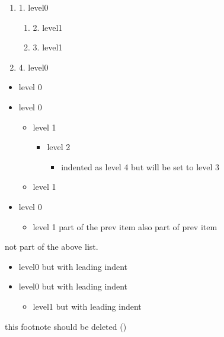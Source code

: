    \begin{enumerate}
   \item 1. level0
\begin{enumerate} 
 \item 2. level1
\item 3. level1
\end{enumerate}
\item 4. level0 

   \end{enumerate}




\begin{itemize}
\item level 0
\item level 0
\begin{itemize} 
 \item level 1
\begin{itemize} 
 \item level 2
\begin{itemize} 
 \item indented as level 4 but will be set to level 3
\end{itemize}
\end{itemize}
\item level 1
\end{itemize}
\item level 0
\begin{itemize} 
 \item level 1 part of the prev item also part of prev item 
\end{itemize}

\end{itemize}

not part of the above list.



\begin{itemize}
\item level0 but with leading indent
\item level0 but with leading indent
\begin{itemize} 
 \item level1 but with leading indent 
\end{itemize}

\end{itemize}



this footnote should be deleted ()


